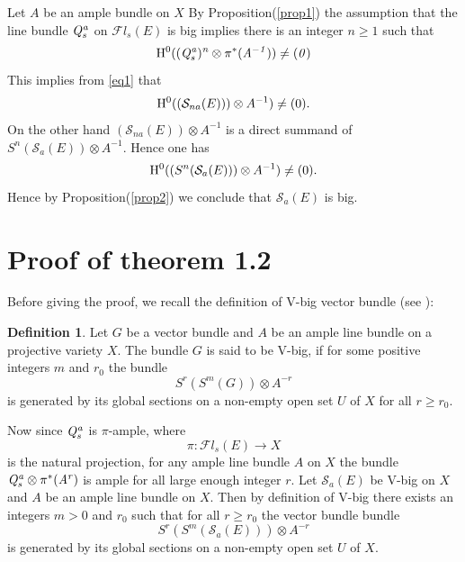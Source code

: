 \documentclass[12pt]{amsart}
\theoremstyle{definition}
\newtheorem{Def}[subsection]{Definition}
\newcommand{\SSS}{{\mathcal S}}
\numberwithin{equation}{section}
\begin{document}
  Let $A$ be an ample bundle on $X$
By Proposition(\ref{prop1}) the assumption that the line bundle $\it Q_s^a$ on  $\mathcal{F}l_s(E)$ is big implies there is an integer $n \geq 1$ such that 
$$ {\rm H}^{0}((\it Q_s^a)^n\otimes \pi^*(A^{-1}))\neq (0)$$
  This implies from \ref{eq1} that 
$$ {\rm H}^{0}((\SSS_{na}(E)))\otimes A^{-1})\neq (0).$$
On the other hand $(\SSS_{na}(E))\otimes A^{-1}$ is a direct summand 
of $S^n(\SSS_{a}(E))\otimes A^{-1}.$ Hence one has 
$$ {\rm H}^{0}((S^n(\SSS_{a}(E)))\otimes A^{-1})\neq (0).$$
Hence by Proposition(\ref{prop2}) we conclude that $\SSS_{a}(E)$ is big.



\section{Proof of theorem 1.2}
Before giving the proof,
we  recall the definition of V-big vector bundle (see \cite{BKKMSU}):

\begin{Def} Let $G$ be a vector bundle and $A$ be an ample line bundle on a projective variety $X.$ The bundle $G$ is said to be V-big,  if 
for some positive integers $m$ and $r_0$ the  bundle $$S^r(S^m(G))\otimes A^{-r}$$
is generated  by its global sections on a non-empty open set $U$ of  $X$ for all $r \geq r_0.$
\end{Def}

Now since $\it Q_s^a$ is $\pi$-ample, where  $$ \pi : \mathcal{F}l_s(E) \to X $$ is the 
natural projection,  for any ample line bundle 
	$A$ on $X$ the bundle $\it Q_s^a\otimes \pi^*(A^r)$ is ample for all large enough integer $r.$
Let $\SSS_a(E)$ be V-big on $X$ and $A$ be an ample line bundle on $X.$  
Then by definition of V-big there exists an integers $m > 0$ and $r_0$ such that for all $r \geq r_0$ the vector bundle bundle 
$$S^r(S^m(\SSS_a(E)))\otimes A^{-r}$$
is generated by its global sections on a non-empty open set $U $ of  $X.$ 
\end{document}
